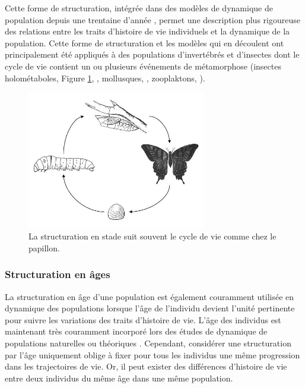 Cette forme de structuration, intégrée dans des modèles de dynamique de
population depuis une trentaine d'année \autocites{gurney1983a,nisbet1983a},
permet une description plus rigoureuse des relations entre les traits
d'histoire de vie individuels et la dynamique de la population. Cette forme de
structuration et les modèles qui en découlent \autocites{nisbet1989a} ont
principalement été appliqués à des populations d'invertébrés et d'insectes dont le cycle de vie contient un ou
plusieurs événements de métamorphose (insectes holométaboles, Figure
\ref{fig:stade}, \citealp{barclay1980model,gurney1980a,nisbet1983a}, mollusques,
\citealp{taris2006phenotypic}, zooplaktons, \citealp{mccauley1996a}).

\begin{figure}[H]
\centering
\includegraphics[width=0.7\textwidth]{1_CorpsDeThese/EA/Fig/stage}
\caption[structuration en stade]{La structuration en stade suit souvent le
cycle de vie comme chez le papillon.}\label{fig:stade}
\end{figure}

\subsubsection{Structuration en âges}

La structuration en âge d'une population est également couramment utilisée en
dynamique des populations lorsque l'âge de l'individu devient l'unité pertinente
pour suivre les variations des traits d'histoire de vie. L'âge des individus est
maintenant très couramment incorporé lors des études de dynamique de populations
naturelles ou théoriques
\autocite[par
ex. ][]{coulson2008a,marteinsdottir2002a,worden2010a,robinson2013a}. 
Cependant, considérer une structuration par l'âge uniquement oblige à fixer pour
tous les individus une même progression dans les trajectoires de vie. Or, il
peut exister des différences d'histoire de vie entre deux individus du même âge
dans une même population.

